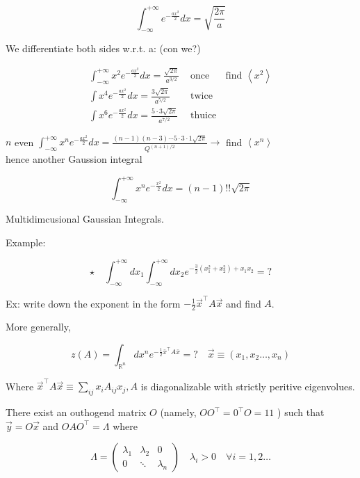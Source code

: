 \documentclass[10pt]{article}
\begin{document}
$$
\int_{-\infty}^{+\infty} e^{-\frac{a x^{2}}{2}} d x=\sqrt{\frac{2 \pi}{a}}
$$

We differentiate both sides w.r.t. a: (con we?)

$$
\begin{array}{ll}
\int_{-\infty}^{+\infty} x^{2} e^{-\frac{a x^{2}}{2}} d x=\frac{\sqrt{2 \pi}}{a^{3 / 2}} & \text { once } \quad \text { find }\left\langle x^{2}\right\rangle \\
\int x^{4} e^{-\frac{a x^{2}}{2}} d x=\frac{3 \sqrt{2 \pi}}{a^{5 / 2}} & \text { twice } \\
\int x^{6} e^{-\frac{a x^{2}}{2}} d x=\frac{5 \cdot 3 \sqrt{2 \pi}}{a^{7 / 2}} & \text { thuice }
\end{array}
$$

$n$ even $\int_{-\infty}^{+\infty} x^{n} e^{-\frac{a x^{2}}{2}} d x=\frac{(n-1)(n-3) \cdots 5 \cdot 3 \cdot 1 \sqrt{2 \pi}}{Q^{(n+1) / 2}} \rightarrow$ find $\left\langle x^{n}\right\rangle$\\
hence another Gaussion integral

$$
\int_{-\infty}^{+\infty} x^{n} e^{-\frac{x^{2}}{2}} d x=(n-1)!!\sqrt{2 \pi}
$$

Multidimcusional Gaussian Integrals.

Example:

$$
\star \quad \int_{-\infty}^{+\infty} d x_{1} \int_{-\infty}^{+\infty} d x_{2} e^{-\frac{3}{2}\left(x_{1}^{2}+x_{2}^{2}\right)+x_{1} x_{2}}=?
$$

Ex: write down the exponent in the form $-\frac{1}{2} \vec{x}^{\top} A \vec{x}$ and find $A$.

More generally,


\begin{equation*}
z(A)=\int_{\mathbb{R}^{n}} d x^{n} e^{-\frac{1}{2} \bar{x}^{\top} A \bar{x}}=? \quad \vec{x} \equiv\left(x_{1}, x_{2} \ldots, x_{n}\right) \tag{7}
\end{equation*}


Where $\vec{x}^{\top} A \vec{x} \equiv \sum_{i j} x_{i} A_{i j} x_{j}, A$ is diagonalizable with strictly peritive eigenvolues.

There exist an outhogend matrix $O$ (namely, $O O^{\top}=0^{\top} O=11$ ) such that $\vec{y}=O \vec{x}$ and $O A O^{\top}=\Lambda$ where

$$
\Lambda=\left(\begin{array}{ccc}
\lambda_{1} & \lambda_{2} & 0 \\
0 & \ddots & \lambda_{n}
\end{array}\right) \quad \lambda_{i}>0 \quad \forall i=1,2 \ldots
$$
\end{document}
